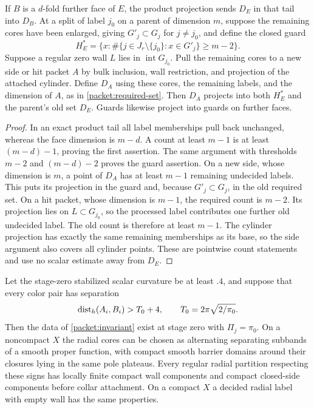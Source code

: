 \begin{lemma}\label{packet:counts}
If $B$ is a $d$-fold further face of $E$, the product projection sends
$D_E$ in that tail into $D_B$.
At a split of label $j_0$ on a parent of dimension $m$, suppose the
remaining cores have been enlarged, giving $G'_j\subset G_j$ for
$j\ne j_0$, and define the closed guard
\begin{equation}\label{packet:guard}
 H_E^*=\bigl\{x:\#\{j\in J_r\setminus\{j_0\}:x\in G'_j\}
                      \ge m-2\bigr\}.
\end{equation}
Suppose a regular zero wall $L$ lies in $\operatorname{int}G_{j_0}$.
Pull the remaining cores to a new side or hit packet $A$ by bulk
inclusion, wall restriction, and projection of the attached cylinder.
Define $D_A$ using these cores, the remaining labels, and the dimension
of $A$, as in \eqref{packet:required-set}.
Then $D_A$ projects into both $H_E^*$ and the parent's old set $D_E$.
Guards likewise project into guards on further faces.
\end{lemma}

\begin{proof}
In an exact product tail all label memberships pull back unchanged,
whereas the face dimension is $m-d$.  A count at least $m-1$ is at
least $(m-d)-1$, proving the first assertion.  The same argument
with thresholds $m-2$ and $(m-d)-2$ proves the guard assertion.
On a new side, whose dimension is $m$, a point of $D_A$ has at least
$m-1$ remaining undecided labels.  This puts its projection in the
guard and, because $G'_j\subset G_j$, in the old required set.
On a hit packet, whose dimension is $m-1$, the required count is
$m-2$.  Its projection lies on $L\subset G_{j_0}$, so the processed
label contributes one further old undecided label.  The old count
is therefore at least $m-1$.  The cylinder projection has exactly
the same remaining memberships as its base, so the side argument
also covers all cylinder points.  These are pointwise count
statements and use no scalar estimate away from $D_E$.
\end{proof}

\begin{lemma}\label{packet:initialization}
Let the stage-zero stabilized scalar curvature be at least $.4$, and
suppose that every color pair has separation
\[
 \operatorname{dist}_h(A_i,B_i)>T_0+4,\qquad
 T_0=2\pi\sqrt{2/\pi_0}.
\]
Then the data of \cref{packet:invariant} exist at stage zero with
$\Pi_j=\pi_0$.  On a noncompact $X$ the radial cores can be chosen
as alternating separating subbands of a smooth proper function,
with compact smooth barrier domains around their closures lying in
the same pole plateaus.  Every regular radial partition respecting
these signs has locally finite compact wall components and compact
closed-side components before collar attachment.  On a compact $X$
a decided radial label with empty wall has the same properties.
\end{lemma}



